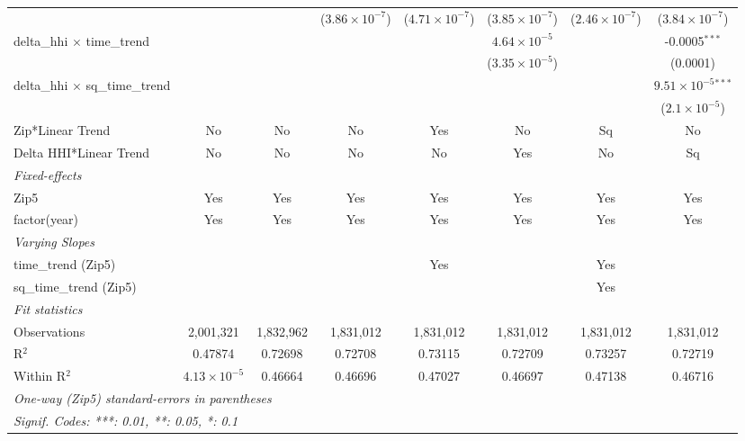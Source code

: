 \begin{table}[H]
{\begin{tabular}{lccccccc}
   &   &    & ($3.86\times 10^{-7}$) & ($4.71\times 10^{-7}$) & ($3.85\times 10^{-7}$) & ($2.46\times 10^{-7}$) & ($3.84\times 10^{-7}$)\\ 

 delta\_hhi $\times $ time\_trend&   &    &    &    & $4.64\times 10^{-5}$ &    & -0.0005$^{***}$\\ 

   &   &    &    &    & ($3.35\times 10^{-5}$) &    & (0.0001)\\ 

 delta\_hhi $\times $ sq\_time\_trend&   &    &    &    &    &    & $9.51\times 10^{-5}$$^{***}$\\ 

   &   &    &    &    &    &    & ($2.1\times 10^{-5}$)\\ 

 Zip*Linear Trend & No & No & No & Yes & No & Sq & No\\ 

 Delta HHI*Linear Trend & No & No & No & No & Yes & No & Sq\\ 

 \midrule \emph{Fixed-effects}&   &   &   &   &   &   &  \\ 

 Zip5 & Yes & Yes & Yes & Yes & Yes & Yes & Yes\\ 

 factor(year) & Yes & Yes & Yes & Yes & Yes & Yes & Yes\\ 

 \midrule \emph{Varying Slopes}&   &   &   &   &   &   &  \\ 

 time\_trend (Zip5) &  &  &  & Yes &  & Yes & \\ 

 sq\_time\_trend (Zip5) &  &  &  &  &  & Yes & \\ 

 \midrule \emph{Fit statistics}&  & & & & & & \\ 

 Observations & 2,001,321&1,832,962&1,831,012&1,831,012&1,831,012&1,831,012&1,831,012\\ 

 R$^2$ & 0.47874&0.72698&0.72708&0.73115&0.72709&0.73257&0.72719\\ 

 Within R$^2$ & $4.13\times 10^{-5}$&0.46664&0.46696&0.47027&0.46697&0.47138&0.46716\\ 

 \midrule\midrule\multicolumn{8}{l}{\emph{One-way (Zip5) standard-errors in parentheses}}\\ 

 \multicolumn{8}{l}{\emph{Signif. Codes: ***: 0.01, **: 0.05, *: 0.1}}\\ 

 \end{tabular}} 

 \end{table} 

